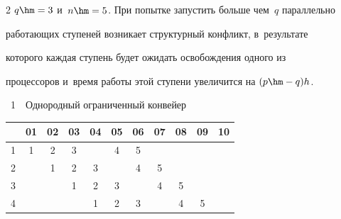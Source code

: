 \begin{multicols}{2}
$q\hm=3$ и~$n\hm=5$. При попытке запустить больше чем~$q$ параллельно 


работающих ступеней возникает структурный конфликт, в~результате 


которого каж\-дая ступень будет ожидать освобождения одного из 


процессоров и~время работы этой ступени увеличится на $(p\hm-q)h$. 





\begin{center}


\vspace*{3pt}




{{\tablename~1}\ \ \small{Однородный ограниченный конвейер }}







\vspace*{9pt}








{\small


\tabcolsep=5.8pt


\begin{tabular}{|c|c|c|c|c|c|c|c|c|c|c|}


\hline


&01&02&03&04&05&06&07&08&09&10\\


\hline


1&1&2&3&&4&5&&&&\\


2&&1&2&3&&4&5&&&\\


3&&&1&2&3&&4&5&&\\


4&&&&1&2&3&&4&5&\\


\hline


\end{tabular}


}


\end{center}











\end{multicols}
